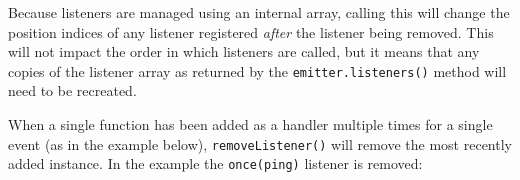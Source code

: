 Because listeners are managed using an internal array, calling this will
change the position indices of any listener registered \emph{after} the
listener being removed. This will not impact the order in which
listeners are called, but it means that any copies of the listener array
as returned by the \texttt{emitter.listeners()} method will need to be
recreated.

When a single function has been added as a handler multiple times for a
single event (as in the example below), \texttt{removeListener()} will
remove the most recently added instance. In the example the
\texttt{once(\textquotesingle{}ping\textquotesingle{})} listener is
removed:

\begin{Shaded}
\begin{Highlighting}[]
\NormalTok{ \{ }\NormalTok{ \} } \OperatorTok{;}
\OperatorTok{=}  \NormalTok{()}\OperatorTok{;}

 \NormalTok{() \{}
  \NormalTok{(}\NormalTok{)}\OperatorTok{;}
\NormalTok{\}}

\NormalTok{(}\OperatorTok{,}\OperatorTok{;}
\NormalTok{(}\OperatorTok{,}\OperatorTok{;}
\NormalTok{(}\OperatorTok{,}\OperatorTok{;}

\NormalTok{(}\NormalTok{)}\OperatorTok{;}
\NormalTok{(}\NormalTok{)}\OperatorTok{;}
\end{Highlighting}
\end{Shaded}

